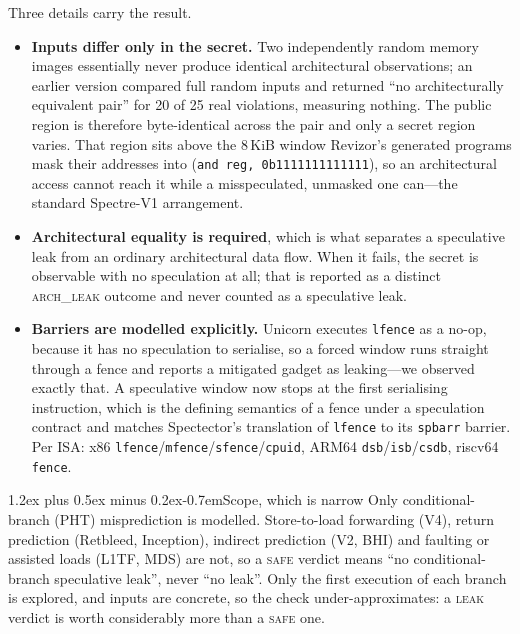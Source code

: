 \documentclass[conference]{IEEEtran}
\makeatletter
\renewcommand\paragraph{\@startsection{paragraph}{4}{\z@}%
  {1.2ex plus 0.5ex minus 0.2ex}{-0.7em}{\normalfont\normalsize\bfseries}}
\makeatother
\begin{document}
Three details carry the result.
\begin{itemize}[itemsep=1pt,leftmargin=1.2em]
  \item \textbf{Inputs differ only in the secret.} Two independently random
    memory images essentially never produce identical architectural
    observations; an earlier version compared full random inputs and returned
    ``no architecturally equivalent pair'' for 20 of 25 real violations,
    measuring nothing. The public region is therefore byte-identical across
    the pair and only a secret region varies. That region sits above the
    8\,KiB window Revizor's generated programs mask their addresses into
    (\texttt{and reg, 0b1111111111111}), so an architectural access cannot
    reach it while a misspeculated, unmasked one can---the standard
    Spectre-V1 arrangement.
  \item \textbf{Architectural equality is required}, which is what separates a
    speculative leak from an ordinary architectural data flow. When it fails,
    the secret is observable with no speculation at all; that is reported as a
    distinct \textsc{arch\_leak} outcome and never counted as a speculative
    leak.
  \item \textbf{Barriers are modelled explicitly.} Unicorn executes
    \texttt{lfence} as a no-op, because it has no speculation to serialise, so
    a forced window runs straight through a fence and reports a mitigated
    gadget as leaking---we observed exactly that. A speculative window now
    stops at the first serialising instruction, which is the defining
    semantics of a fence under a speculation contract and matches Spectector's
    translation of \texttt{lfence} to its \texttt{spbarr} barrier. Per ISA:
    x86 \texttt{lfence}/\texttt{mfence}/\texttt{sfence}/\texttt{cpuid},
    ARM64 \texttt{dsb}/\texttt{isb}/\texttt{csdb}, riscv64 \texttt{fence}.
\end{itemize}

\paragraph{Scope, which is narrow}
Only conditional-branch (PHT) misprediction is modelled. Store-to-load
forwarding (V4), return prediction (Retbleed, Inception), indirect prediction
(V2, BHI) and faulting or assisted loads (L1TF, MDS) are not, so a
\textsc{safe} verdict means ``no conditional-branch speculative leak'', never
``no leak''. Only the first execution of each branch is explored, and inputs
are concrete, so the check under-approximates: a \textsc{leak} verdict is worth
considerably more than a \textsc{safe} one.
\end{document}
